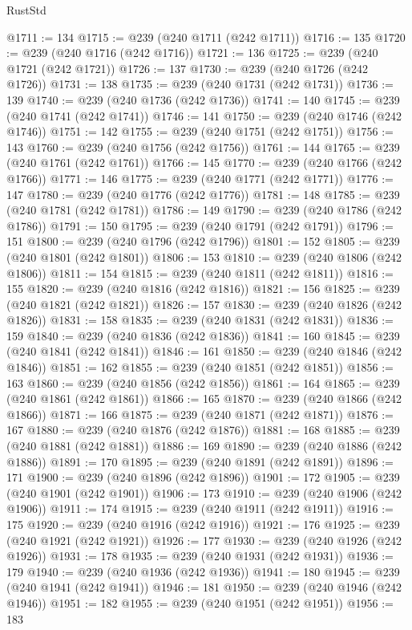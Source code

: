 \begin{lexlean}{RustStd}
\begin{coremodule}
{\begin{coremodule}
{{{{{{{{{{{{{{{{{{{{{{{{{{{{{{{{{{{{{{{{{{{{{{{{{{{{{{{{{{{{@1711 := 134
@1715 := @239 (@240 @1711 (@242 @1711))
@1716 := 135
@1720 := @239 (@240 @1716 (@242 @1716))
@1721 := 136
@1725 := @239 (@240 @1721 (@242 @1721))
@1726 := 137
@1730 := @239 (@240 @1726 (@242 @1726))
@1731 := 138
@1735 := @239 (@240 @1731 (@242 @1731))
@1736 := 139
@1740 := @239 (@240 @1736 (@242 @1736))
@1741 := 140
@1745 := @239 (@240 @1741 (@242 @1741))
@1746 := 141
@1750 := @239 (@240 @1746 (@242 @1746))
@1751 := 142
@1755 := @239 (@240 @1751 (@242 @1751))
@1756 := 143
@1760 := @239 (@240 @1756 (@242 @1756))
@1761 := 144
@1765 := @239 (@240 @1761 (@242 @1761))
@1766 := 145
@1770 := @239 (@240 @1766 (@242 @1766))
@1771 := 146
@1775 := @239 (@240 @1771 (@242 @1771))
@1776 := 147
@1780 := @239 (@240 @1776 (@242 @1776))
@1781 := 148
@1785 := @239 (@240 @1781 (@242 @1781))
@1786 := 149
@1790 := @239 (@240 @1786 (@242 @1786))
@1791 := 150
@1795 := @239 (@240 @1791 (@242 @1791))
@1796 := 151
@1800 := @239 (@240 @1796 (@242 @1796))
@1801 := 152
@1805 := @239 (@240 @1801 (@242 @1801))
@1806 := 153
@1810 := @239 (@240 @1806 (@242 @1806))
@1811 := 154
@1815 := @239 (@240 @1811 (@242 @1811))
@1816 := 155
@1820 := @239 (@240 @1816 (@242 @1816))
@1821 := 156
@1825 := @239 (@240 @1821 (@242 @1821))
@1826 := 157
@1830 := @239 (@240 @1826 (@242 @1826))
@1831 := 158
@1835 := @239 (@240 @1831 (@242 @1831))
@1836 := 159
@1840 := @239 (@240 @1836 (@242 @1836))
@1841 := 160
@1845 := @239 (@240 @1841 (@242 @1841))
@1846 := 161
@1850 := @239 (@240 @1846 (@242 @1846))
@1851 := 162
@1855 := @239 (@240 @1851 (@242 @1851))
@1856 := 163
@1860 := @239 (@240 @1856 (@242 @1856))
@1861 := 164
@1865 := @239 (@240 @1861 (@242 @1861))
@1866 := 165
@1870 := @239 (@240 @1866 (@242 @1866))
@1871 := 166
@1875 := @239 (@240 @1871 (@242 @1871))
@1876 := 167
@1880 := @239 (@240 @1876 (@242 @1876))
@1881 := 168
@1885 := @239 (@240 @1881 (@242 @1881))
@1886 := 169
@1890 := @239 (@240 @1886 (@242 @1886))
@1891 := 170
@1895 := @239 (@240 @1891 (@242 @1891))
@1896 := 171
@1900 := @239 (@240 @1896 (@242 @1896))
@1901 := 172
@1905 := @239 (@240 @1901 (@242 @1901))
@1906 := 173
@1910 := @239 (@240 @1906 (@242 @1906))
@1911 := 174
@1915 := @239 (@240 @1911 (@242 @1911))
@1916 := 175
@1920 := @239 (@240 @1916 (@242 @1916))
@1921 := 176
@1925 := @239 (@240 @1921 (@242 @1921))
@1926 := 177
@1930 := @239 (@240 @1926 (@242 @1926))
@1931 := 178
@1935 := @239 (@240 @1931 (@242 @1931))
@1936 := 179
@1940 := @239 (@240 @1936 (@242 @1936))
@1941 := 180
@1945 := @239 (@240 @1941 (@242 @1941))
@1946 := 181
@1950 := @239 (@240 @1946 (@242 @1946))
@1951 := 182
@1955 := @239 (@240 @1951 (@242 @1951))
@1956 := 183
}}}}}}}}}}}}}}}}}}}}}}}}}}}}}}}}}}}}}}}}}}}}}}}}}}}}}}}}}}}}
\end{coremodule}}
\end{coremodule}
\end{lexlean}
